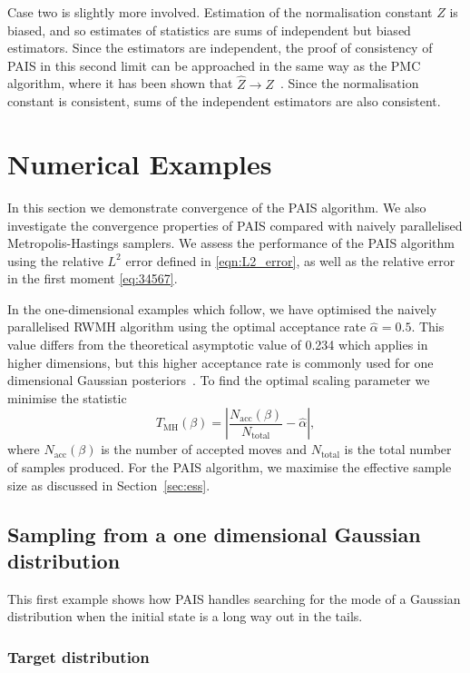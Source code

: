 \documentclass[final]{siamltex}
\begin{document}
Case two is slightly more involved. Estimation of the normalisation constant $Z$ is biased, and so estimates of statistics are sums of independent but biased estimators. Since the estimators are independent, the proof of consistency of PAIS in this second limit can be approached in the same way as the PMC algorithm, where it has been shown that $\hat{Z}\rightarrow Z$~\cite{robert2013monte}. Since the normalisation constant is consistent, sums of the independent estimators are also consistent.


\section{Numerical Examples}\label{Sec:Num}

In this section we demonstrate convergence of the PAIS algorithm. We
also investigate the convergence properties of PAIS compared with
naively parallelised Metropolis-Hastings samplers. We assess the
performance of the PAIS algorithm using the relative $L^2$ error
defined in \eqref{eqn:L2_error}, as well as the relative error in the
first moment \eqref{eq:34567}.

In the one-dimensional examples which follow, we have optimised the
naively parallelised RWMH algorithm using the optimal acceptance rate
$\hat{\alpha} = 0.5$. This value differs from the theoretical
asymptotic value of 0.234 which applies in higher dimensions, but this
higher acceptance rate is commonly used for one dimensional Gaussian
posteriors~\cite{rosenthal2011optimal}. To find the optimal scaling
parameter we minimise the statistic
\[
	T_{\text{MH}}(\beta) = \left| \frac{N_{\text{acc}}(\beta)}{N_{\text{total}}} - \hat{\alpha} \right|,
\]
where $N_{\text{acc}}(\beta)$ is the number of accepted moves and
$N_{\text{total}}$ is the total number of samples produced. For the
PAIS algorithm, we maximise the effective sample size as
discussed in Section~\ref{sec:ess}.

\subsection{Sampling from a one dimensional Gaussian distribution}\label{sec:problem 1}

This first example shows how PAIS handles searching for the mode of a
Gaussian distribution when the initial state is a long way out in the
tails.

\subsubsection{Target distribution}
\end{document}
